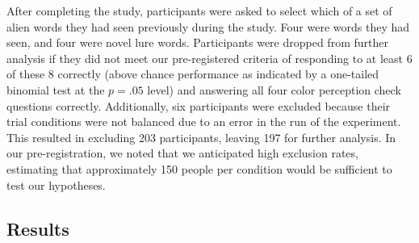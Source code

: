 \documentclass{ucetd}
\begin{document}
After completing the study, participants were asked to select which of a
set of alien words they had seen previously during the study. Four were
words they had seen, and four were novel lure words. Participants were
dropped from further analysis if they did not meet our pre-registered
criteria of responding to at least 6 of these 8 correctly (above chance
performance as indicated by a one-tailed binomial test at the
\(p = .05\) level) and answering all four color perception check
questions correctly. Additionally, six participants were excluded
because their trial conditions were not balanced due to an error in the
run of the experiment. This resulted in excluding 203 participants,
leaving 197 for further analysis. In our pre-registration, we noted that
we anticipated high exclusion rates, estimating that approximately 150
people per condition would be sufficient to test our hypotheses.

\hypertarget{results-3}{%
\subsection{Results}\label{results-3}}
\end{document}
